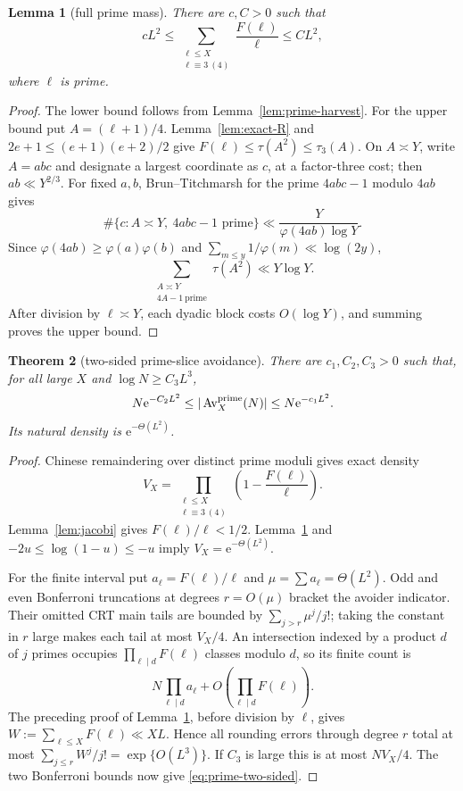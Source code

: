 \documentclass[10pt,reqno]{amsart}
\newtheorem{theorem}{Theorem}[section]
\newtheorem{lemma}[theorem]{Lemma}
\theoremstyle{definition}
\newcommand{\Av}{\operatorname {Av}}
\newcommand{\e}{\mathrm e}
\newcommand{\1}{\mathbf 1}
\begin{document}
\begin{lemma}[full prime mass]\label{lem:prime-mass}
There are $c,C>0$ such that
\begin{equation}\label{eq:prime-mass}
 cL^2\leq\sum_{\substack{\ell\leq X\\\ell\equiv3\ (4)}}\frac{F(\ell)}\ell\leq CL^2,
\end{equation}
where $\ell$ is prime.
\end{lemma}
\begin{proof}
The lower bound follows from Lemma~\ref{lem:prime-harvest}.  For the upper bound put $A=(\ell+1)/4$.  Lemma~\ref{lem:exact-R} and $2e+1\leq(e+1)(e+2)/2$ give
$F(\ell)\leq\tau(A^2)\leq\tau_3(A)$.  On $A\asymp Y$, write $A=abc$ and designate a largest coordinate as $c$, at a factor-three cost; then $ab\ll Y^{2/3}$.  For fixed $a,b$, Brun--Titchmarsh for the prime $4abc-1$ modulo $4ab$ gives
\[
 \#\{c:A\asymp Y,\ 4abc-1\text{ prime}\}
 \ll\frac{Y}{\varphi(4ab)\log Y}.
\]
Since $\varphi(4ab)\geq\varphi(a)\varphi(b)$ and
$\sum_{m\leq y}1/\varphi(m)\ll\log(2y)$,
\[
 \sum_{\substack{A\asymp Y\\4A-1\ \mathrm{prime}}}\tau(A^2)\ll Y\log Y.
\]
After division by $\ell\asymp Y$, each dyadic block costs $O(\log Y)$, and summing proves the upper bound.
\end{proof}

\begin{theorem}[two-sided prime-slice avoidance]\label{thm:prime-two-sided}
There are $c_1,C_2,C_3>0$ such that, for all large $X$ and $\log N\geq C_3L^3$,
\begin{equation}\label{eq:prime-two-sided}
 N\e^{-C_2L^2}\leq|\Av_X^{\rm prime}(N)|
 \leq N\e^{-c_1L^2}.
\end{equation}
Its natural density is $\e^{-\Theta(L^2)}$.
\end{theorem}
\begin{proof}
Chinese remaindering over distinct prime moduli gives exact density
\[
 V_X=\prod_{\substack{\ell\leq X\\\ell\equiv3\ (4)}}
 \left(1-\frac{F(\ell)}\ell\right).
\]
Lemma~\ref{lem:jacobi} gives $F(\ell)/\ell<1/2$.  Lemma~\ref{lem:prime-mass} and
$-2u\leq\log(1-u)\leq-u$ imply $V_X=\e^{-\Theta(L^2)}$.

For the finite interval put $a_\ell=F(\ell)/\ell$ and $\mu=\sum a_\ell=\Theta(L^2)$.  Odd and even Bonferroni truncations at degrees $r=O(\mu)$ bracket the avoider indicator.  Their omitted CRT main tails are bounded by
$\sum_{j>r}\mu^j/j!$; taking the constant in $r$ large makes each tail at most $V_X/4$.  An intersection indexed by a product $d$ of $j$ primes occupies $\prod_{\ell\mid d}F(\ell)$ classes modulo $d$, so its finite count is
\[
 N\prod_{\ell\mid d}a_\ell+O\!\left(\prod_{\ell\mid d}F(\ell)\right).
\]
The preceding proof of Lemma~\ref{lem:prime-mass}, before division by $\ell$, gives $W:=\sum_{\ell\leq X}F(\ell)\ll XL$.  Hence all rounding errors through degree $r$ total at most
$\sum_{j\leq r}W^j/j!=\exp\{O(L^3)\}$.  If $C_3$ is large this is at most $NV_X/4$.  The two Bonferroni bounds now give \eqref{eq:prime-two-sided}.
\end{proof}
\end{document}
